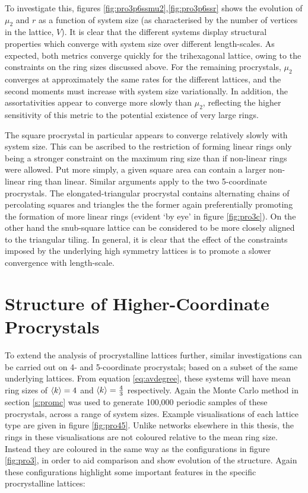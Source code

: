 To investigate this, figures \ref{fig:pro3p6ssmu2},\ref{fig:pro3p6ssr} shows the evolution of $\mu_2$ and $r$ as a function of system size (as characterised
by the number of vertices in the lattice, $V$). 
It is clear that the different systems display structural properties
which converge with system size over different length\--scales. 
As expected, both metrics converge quickly for the trihexagonal lattice, owing to the constraints on the ring sizes discussed above.
For the remaining procrystals, $\mu_2$ converges at approximately
the same rates for the different lattices, and the second moments must increase with system size variationally.
In addition, the assortativities appear to converge more slowly than $\mu_2$, reflecting the higher sensitivity of this metric to the potential existence of very large rings.

The square procrystal in particular appears to converge relatively slowly with system size. 
This can be ascribed to the restriction of forming linear rings only being a stronger constraint on the maximum ring size than if non\--linear rings
were allowed. 
Put more simply, a given square area can contain a larger non\--linear ring than linear. 
Similar arguments apply to the two 5\--coordinate procrystals.
The elongated\--triangular procrystal contains alternating chains of percolating squares and triangles the the former again preferentially promoting the formation of more linear rings (evident `by eye' in figure \ref{fig:pro3c}).
On the other hand the snub\--square lattice can be considered to be more closely aligned to the triangular tiling.
In general, it is clear that the effect of the constraints imposed by the underlying high symmetry lattices is to promote a slower convergence with length\--scale.


\section{Structure of Higher\--Coordinate Procrystals}
\label{s:pro45}

To extend the analysis of procrystalline lattices further, similar investigations can be carried out on 4\-- and 5\--coordinate procrystals; based on a subset of the same underlying lattices.
From equation \eqref{eq:avdegree}, these systems will have mean ring sizes of $\langle k \rangle=4$ and $\langle k \rangle=\frac{4}{3}$ respectively.
Again the Monte Carlo method in section \ref{s:promc} was used to generate 100,000 periodic samples of these procrystals, across a range of system sizes.
Example visualisations of each lattice type are given in figure \ref{fig:pro45}.
Unlike networks elsewhere in this thesis, the rings in these visualisations are not coloured relative to the mean ring size.
Instead they are coloured in the same way as the configurations in figure \ref{fig:pro3}, in order to aid comparison and show evolution of the structure. 
Again these configurations highlight some important features in the specific procrystalline lattices:

